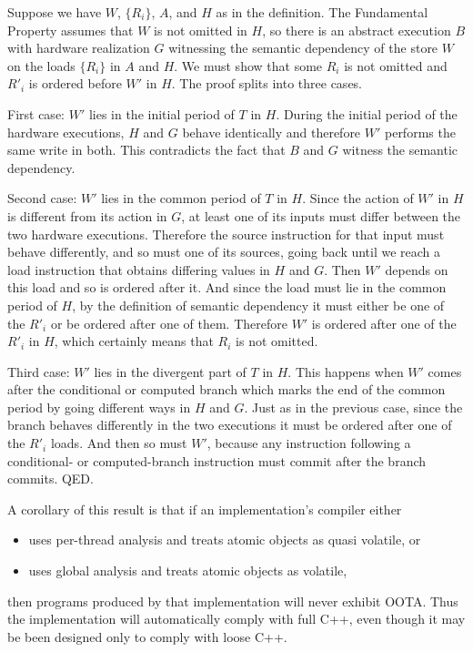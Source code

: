 Suppose we have $W$, $\{R_i\}$, $A$, and $H$ as in the definition.
The Fundamental Property assumes that $W$ is not omitted in $H$, so
there is an abstract execution $B$ with hardware realization $G$
witnessing the semantic dependency of the store $W$ on the loads
$\{R_i\}$ in $A$ and $H$.
We must show that some $R_i$ is not omitted and $R'_i$ is ordered
before $W'$ in $H$.
The proof splits into three cases.

First case: $W'$ lies in the initial period of $T$ in $H$.
During the initial period of the hardware executions, $H$ and $G$
behave identically and therefore $W'$ performs the same write in
both.
This contradicts the fact that $B$ and $G$ witness the semantic
dependency.

Second case: $W'$ lies in the common period of $T$ in $H$.
Since the action of $W'$ in $H$ is different from its action in $G$,
at least one of its inputs must differ between the two hardware
executions.
Therefore the source instruction for that input must behave
differently, and so must one of its sources, going back until we reach
a load instruction that obtains differing values in $H$ and $G$.
Then $W'$ depends on this load and so is ordered after it.
And since the load must lie in the common period of $H$, by the
definition of semantic dependency it must either be one of the
$R'_i$ or be ordered after one of them.
Therefore $W'$ is ordered after one of the $R'_i$ in $H$,
which certainly means that $R_i$ is not omitted.

Third case: $W'$ lies in the divergent part of $T$ in $H$.
This happens when $W'$ comes after the conditional or computed branch
which marks the end of the common period by going different ways in
$H$ and $G$.
Just as in the previous case, since the branch behaves differently in
the two executions it must be ordered after one of the $R'_i$ loads.
And then so must $W'$, because any instruction following a conditional-
or computed-branch instruction must commit after the branch commits.
QED.

A corollary of this result is that if an implementation's compiler
either
\begin{itemize}
\item	uses per-thread analysis and treats atomic objects as
	quasi volatile, or
\item	uses global analysis and treats atomic objects as volatile,
\end{itemize}
then programs produced by that implementation will never exhibit OOTA.
Thus the implementation will automatically comply with full C++, even
though it may be been designed only to comply with loose C++.

